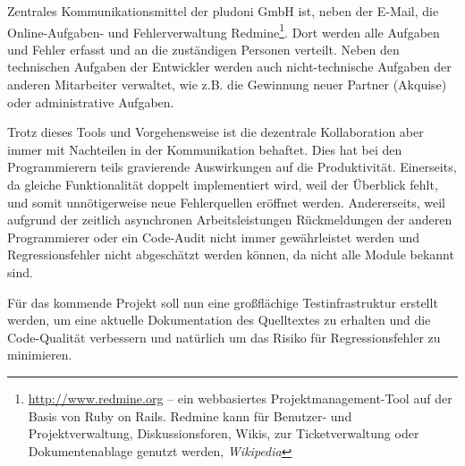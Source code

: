 Zentrales Kommunikationsmittel der pludoni GmbH ist, neben der E-Mail, die Online-Aufgaben- und Fehlerverwaltung Redmine\footnote{\url{http://www.redmine.org} -- ein webbasiertes Projektmanagement-Tool auf der Basis von Ruby on Rails. Redmine kann für Benutzer- und Projektverwaltung, Diskussionsforen, Wikis, zur Ticketverwaltung oder Dokumentenablage genutzt werden, \textit{Wikipedia}}. Dort werden alle Aufgaben und Fehler erfasst und an die zuständigen Personen verteilt.
Neben den technischen Aufgaben der Entwickler werden auch nicht-technische Aufgaben der anderen Mitarbeiter verwaltet, wie z.B. die Gewinnung neuer Partner (Akquise) oder administrative Aufgaben.

Trotz dieses Tools und Vorgehensweise ist die dezentrale Kollaboration aber immer mit Nachteilen in der Kommunikation behaftet. Dies hat bei den Programmierern teils gravierende Auswirkungen auf die Produktivität. Einerseits, da gleiche Funktionalität doppelt implementiert wird, weil der Überblick fehlt, und somit unnötigerweise neue Fehlerquellen eröffnet werden. Andererseits, weil aufgrund der zeitlich asynchronen Arbeitsleistungen Rückmeldungen der anderen Programmierer oder ein Code-Audit nicht immer gewährleistet werden und Regressionsfehler nicht abgeschätzt werden können, da nicht alle Module bekannt sind.


Für das kommende Projekt soll nun eine großflächige Testinfrastruktur erstellt werden, um eine aktuelle Dokumentation des Quelltextes zu erhalten und die Code-Qualität verbessern und natürlich um das Risiko für Regressionsfehler zu minimieren.
